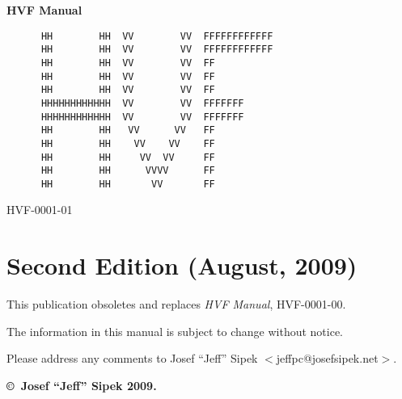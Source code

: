 \begin{titlepage}
\vspace*{0.5in}
\Huge \textbf{HVF Manual}
\normalsize
\vspace{1.4in}
\Large
\begin{verbatim}
      HH        HH  VV        VV  FFFFFFFFFFFF
      HH        HH  VV        VV  FFFFFFFFFFFF
      HH        HH  VV        VV  FF
      HH        HH  VV        VV  FF
      HH        HH  VV        VV  FF
      HHHHHHHHHHHH  VV        VV  FFFFFFF
      HHHHHHHHHHHH  VV        VV  FFFFFFF
      HH        HH   VV      VV   FF
      HH        HH    VV    VV    FF
      HH        HH     VV  VV     FF
      HH        HH      VVVV      FF
      HH        HH       VV       FF
\end{verbatim}
\normalsize
{}
\hfill HVF-0001-01
\newpage
{}
\cbstart
\section*{Second Edition (August, 2009)}
This publication obsoletes and replaces \emph{HVF Manual}, HVF-0001-00.
\cbend

\cbstart The \cbend information in this manual is subject to change without notice.

Please address any comments to Josef ``Jeff'' Sipek
$<$jeffpc@josefsipek.net$>$.

\textbf{\copyright\ Josef ``Jeff'' Sipek 2009.}
\end{titlepage}
